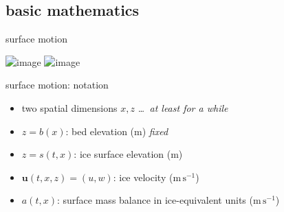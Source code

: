 \documentclass[10pt,dvipsnames]{beamer}
\newcommand{\bu}{\mathbf{u}}
\newcommand{\comm}[1]{{\footnotesize \hfill \emph{#1}}}
\begin{document}
\subsection{basic mathematics}


\begin{frame}{surface motion}

\bigskip
\begin{center}
\includegraphics<1>[width=\textwidth]{noboat}
\includegraphics<2>[width=\textwidth]{boatplus}
\end{center}


\end{frame}

\begin{frame}{surface motion: notation}
\begin{center}
\end{center}

\vspace{-3mm}
\begin{itemize}
\item two spatial dimensions $x,z$ \comm{\dots\, at least for a while}
\item $z = b(x)$: bed elevation (m) \comm{fixed}
\item $z = s(t,x)$: ice surface elevation (m)
\item $\bu(t,x,z)=(u,w)$: ice velocity ($\text{m}\,\text{s}^{-1}$)
\item $a(t,x)$: surface mass balance in ice-equivalent units ($\text{m}\,\text{s}^{-1}$)
\end{itemize}
\end{frame}
\end{document}
